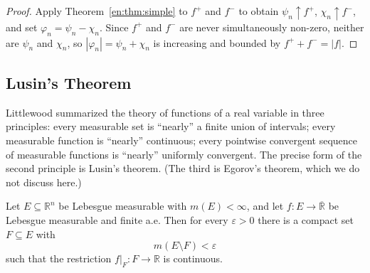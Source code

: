 \documentclass[11pt]{article}
\makeatletter
\newcommand{\envlabel}[1]{\protected@edef\@currentlabel{\themathenv}\label{#1}}
\makeatother
\begin{document}
\begin{proof}
Apply Theorem~\ref{en:thm:simple} to $f^{+}$ and $f^{-}$ to obtain $\psi_{n}\uparrow f^{+}$, $\chi_{n}\uparrow f^{-}$, and set $\varphi_{n}=\psi_{n}-\chi_{n}$. Since $f^{+}$ and $f^{-}$ are never simultaneously non-zero, neither are $\psi_{n}$ and $\chi_{n}$, so $|\varphi_{n}|=\psi_{n}+\chi_{n}$ is increasing and bounded by $f^{+}+f^{-}=|f|$.
\end{proof}

\subsection{Lusin's Theorem}

Littlewood summarized the theory of functions of a real variable in three principles: every measurable set is ``nearly'' a finite union of intervals; every measurable function is ``nearly'' continuous; every pointwise convergent sequence of measurable functions is ``nearly'' uniformly convergent. The precise form of the second principle is Lusin's theorem. (The third is Egorov's theorem, which we do not discuss here.)

\begin{theorem}[Lusin]\envlabel{en:thm:lusin}
Let $E\subseteq\mathbb{R}^{n}$ be Lebesgue measurable with $m(E)<\infty$, and let $f:E\to\overline{\mathbb{R}}$ be Lebesgue measurable and finite a.e. Then for every $\varepsilon>0$ there is a compact set $F\subseteq E$ with
\[
m(E\setminus F)<\varepsilon
\]
such that the restriction $f|_{F}:F\to\mathbb{R}$ is continuous.
\end{theorem}
\end{document}
